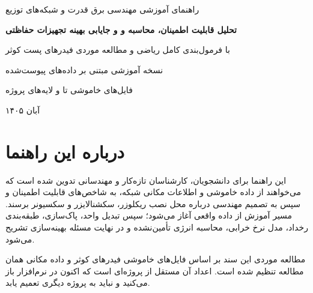 \documentclass[11pt,a4paper,oneside]{book}
\newcommand{\file}[1]{\lr{\texttt{#1}}}
\begin{document}
\begin{titlepage}
\centering
\vspace*{1.3cm}
{\Large راهنمای آموزشی مهندسی برق قدرت و شبکه‌های توزیع\par}
\vspace{1.2cm}
{\Huge\bfseries تحلیل قابلیت اطمینان، محاسبه  و  و جایابی بهینه تجهیزات حفاظتی\par}
\vspace{0.8cm}
{\LARGE با فرمول‌بندی کامل ریاضی و مطالعه موردی فیدرهای پست کوثر\par}
\vspace{1.3cm}
\vfill
{\large نسخه آموزشی مبتنی بر داده‌های پیوست‌شده\par}
{\large فایل‌های خاموشی \file{3.xlsx} تا \file{7.xlsx} و لایه‌های  پروژه \file{Kosar.zip}\par}
\vspace{0.7cm}
{\large آبان ۱۴۰۵\par}
\end{titlepage}

\frontmatter
\chapter*{درباره این راهنما}
این راهنما برای دانشجویان، کارشناسان تازه‌کار و مهندسانی تدوین شده است که می‌خواهند از داده خاموشی و اطلاعات مکانی شبکه، به شاخص‌های قابلیت اطمینان و سپس به تصمیم مهندسی درباره محل نصب ریکلوزر، سکشنالایزر و سکسیونر برسند. مسیر آموزش از داده واقعی آغاز می‌شود؛ سپس تبدیل واحد، پاک‌سازی، طبقه‌بندی رخداد، مدل نرخ خرابی، محاسبه انرژی تأمین‌نشده و در نهایت مسئله بهینه‌سازی تشریح می‌شود.

مطالعه موردی این سند بر اساس فایل‌های خاموشی فیدرهای کوثر و داده مکانی همان مطالعه تنظیم شده است. اعداد آن مستقل از پروژه‌ای است که اکنون در نرم‌افزار باز می‌کنید و نباید به پروژه دیگری تعمیم یابد.
\end{document}
